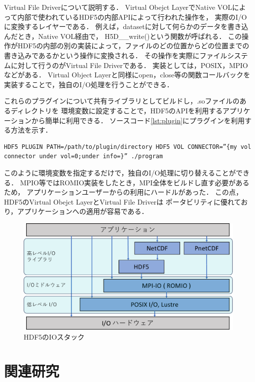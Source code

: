 \documentclass[submit,techrep,noauthor]{ipsj}
\begin{document}
Virtual File Driverについて説明する．
Virtual Obejct LayerでNative VOLによって内部で使われているHDF5の内部APIによって行われた操作を，
実際のI/Oに変換するレイヤーである．
例えば，datasetに対して何らかのデータを書き込んだとき，Native VOL経由で，
H5D\_\_write()という関数が呼ばれる．
この操作がHDF5の内部の別の実装によって，ファイルのどの位置からどの位置までの書き込みであるかという操作に変換される．
その操作を実際にファイルシステムに対して行うのがVirtual File Driverである．
実装としては，POSIX，MPIOなどがある．
Virtual Object Layerと同様にopen，close等の関数コールバックを実装することで，独自のI/O処理を行うことができる．

これらのプラグインについて共有ライブラリとしてビルドし，.soファイルのあるディレクトリを
環境変数に設定することで，HDF5のAPIを利用するアプリケーションから簡単に利用できる．
ソースコード\ref{lst:plugin}にプラグインを利用する方法を示す．
\begin{lstlisting}[caption=プラグインの利用方法, label=lst:plugin]
HDF5 PLUGIN PATH=/path/to/plugin/directory HDF5 VOL CONNECTOR=”{my vol connector under vol=0;under info=}” ./program
\end{lstlisting}
このように環境変数を指定するだけで，独自のI/O処理に切り替えることができる．
MPIO等ではROMIO実装をしたとき，MPI全体をビルドし直す必要があるため，
アプリケーションユーザーからの利用にハードルがあった．
この点，HDF5のVirtual Obejct LayerとVirtual File Driverは
ポータビリティに優れており，アプリケーションへの適用が容易である．


\begin{figure}[tbp]
	\centering
	\includegraphics[page=7,width=\linewidth]{figure-crop.pdf}
	\caption{HDF5のIOスタック}
	\label{fig:hdf5stack}
\end{figure}

\section{関連研究}
\end{document}
